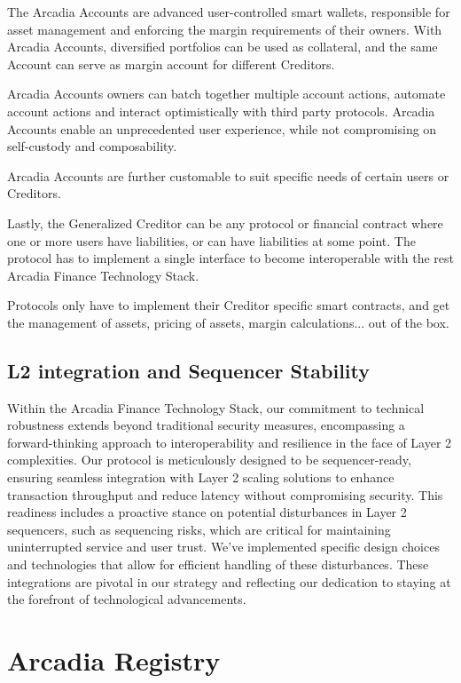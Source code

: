 \documentclass[sigconf,nonacm]{acmart}
\begin{document}
The Arcadia Accounts are advanced user-controlled smart wallets, responsible for asset management and enforcing the margin requirements of their owners.
With Arcadia Accounts, diversified portfolios can be used as collateral, and the same Account can serve as margin account for different Creditors.

Arcadia Accounts owners can batch together multiple account actions, automate account actions and interact optimistically with third party protocols.
Arcadia Accounts enable an unprecedented user experience, while not compromising on self-custody and composability.

Arcadia Accounts are further customable to suit specific needs of certain users or Creditors.

Lastly, the Generalized Creditor can be any protocol or financial contract where one or more users have liabilities, or can have liabilities at some point.
The protocol has to implement a single interface to become interoperable with the rest Arcadia Finance Technology Stack.

Protocols only have to implement their Creditor specific smart contracts,
and get the management of assets, pricing of assets, margin calculations... out of the box.

\subsection{L2 integration and Sequencer Stability}
\label{l2-integration-stability}

Within the Arcadia Finance Technology Stack, our commitment to technical robustness extends beyond traditional security measures, 
encompassing a forward-thinking approach to interoperability and resilience in the face of Layer 2 complexities. 
Our protocol is meticulously designed to be sequencer-ready, ensuring seamless integration with Layer 2 scaling solutions to enhance transaction 
throughput and reduce latency without compromising security. This readiness includes a proactive stance on potential disturbances in Layer 2 sequencers, 
such as sequencing risks, which are critical for maintaining uninterrupted service and user trust. 
We've implemented specific design choices and technologies that allow for efficient handling of these disturbances.
These integrations are pivotal in our strategy and reflecting our dedication to staying at the forefront of technological advancements.

\section{Arcadia Registry}
\label{sec:arcadia-registry}
\end{document}
